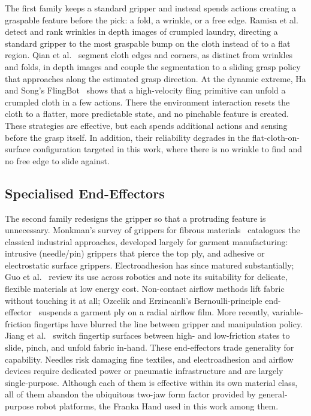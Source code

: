 The first family keeps a standard gripper and instead spends actions
creating a graspable feature before the pick: a fold, a wrinkle, or a
free edge. Ramisa et al.~\cite{ramisa2012wrinkled} detect and rank
wrinkles in depth images of crumpled laundry, directing a standard
gripper to the most graspable bump on the cloth instead of to a flat
region. Qian et al.~\cite{qian2020clothregion} segment cloth edges
and corners, as distinct from wrinkles and folds, in depth images and
couple the segmentation to a sliding grasp policy that approaches along
the estimated grasp direction. At the dynamic extreme, Ha and
Song's FlingBot~\cite{ha2021flingbot} shows that a high-velocity fling
primitive can unfold a crumpled cloth in a few actions. There the
environment interaction resets the cloth to a flatter, more predictable
state, and no pinchable feature is created. These strategies are
effective, but each spends additional actions and sensing before the
grasp itself. In addition, their reliability degrades in the
flat-cloth-on-surface configuration targeted in this work, where there is
no wrinkle to find and no free edge to slide against.

\subsection{Specialised End-Effectors}

The second family redesigns the gripper so that a protruding feature is
unnecessary. Monkman's survey of grippers for fibrous
materials~\cite{monkman1995fibrous} catalogues the classical industrial
approaches, developed largely for garment manufacturing: intrusive
(needle/pin) grippers that pierce the top ply, and adhesive or
electrostatic surface grippers. Electroadhesion has since matured substantially;
Guo et al.~\cite{guo2020electroadhesion} review its use across robotics
and note its suitability for delicate, flexible materials at low
energy cost. Non-contact airflow methods lift fabric without touching it
at all; Ozcelik and Erzincanli's Bernoulli-principle
end-effector~\cite{ozcelik2002noncontact} suspends a garment ply on a
radial airflow film. More recently, variable-friction fingertips have
blurred the line between gripper and manipulation policy. Jiang et
al.~\cite{jiang2022variablefriction} switch fingertip surfaces between
high- and low-friction states to slide, pinch, and unfold fabric in-hand.
These end-effectors trade generality for capability. Needles risk damaging
fine textiles, and electroadhesion and airflow devices require dedicated
power or pneumatic infrastructure and are largely single-purpose.
Although each of them is effective within its own material class, all of
them abandon the ubiquitous two-jaw form factor provided by
general-purpose robot platforms, the Franka Hand used in this work among
them.

